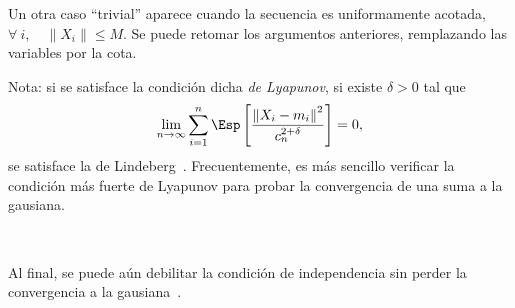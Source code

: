 Un otra caso  ``trivial'' aparece cuando la secuencia  es uniformamente acotada,
\ie \  $\forall \: i, \quad  \| X_i \| \le  M$. Se puede  retomar los argumentos
anteriores, remplazando las variables por la cota.

Nota: si se satisface la condici\'on  dicha {\it de Lyapunov}, si existe $\delta
> 0$ tal que
%
\[
\lim_{n   \to  \infty}   \sum_{i=1}^n   \Esp\left[  \frac{\left\|   X_i  -   m_i
    \right\|^2}{c_n^{2+\delta}} \right] = 0,
\]
%
se satisface la de  Lindeberg~\cite{AshDol99}. Frecuentemente, es m\'as sencillo
verificar la condici\'on m\'as fuerte de Lyapunov para probar la convergencia de
una suma a la gausiana.

\

Al final, se puede a\'un debilitar la condici\'on de independencia sin perder la
convergencia a la gausiana~\cite[Sec.~6.4]{BroDav87}.
